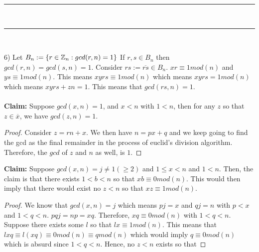 \documentclass[../Main.tex]{subfiles}
\begin{document}
\begin{center}    
    \rule[1ex]{.8\textwidth}{1pt}\\
    \rule[1.9ex]{.7\textwidth}{.6pt}\\[-6pt]
    
\end{center}
6) Let $B_n:=\{r \in \mathbb Z_n: gcd(r,n)=1\}$
If $r, s \in B_n$ then $gcd(r,n)=gcd(s,n)=1$. Consider $rs:= \overline{rs} \in B_n$. $xr \equiv 1 mod(n)$ and $ys \equiv 1 mod(n)$. This means $xy rs \equiv 1 mod(n)$ which means $xy rs=1 mod(n)$ which means $xy rs +zn=1$. This means that $gcd(rs,n)=1$.
\\\\ \textbf{Claim:} Suppose $gcd(x,n)=1$, and $x< n$ with $1<n$, then for any $z$ so that $z \in \overline{x}$, we have $gcd(z,n)=1$. 
\\ \begin{proof}
Consider $z=rn+x$. We then have $n=px+q$ and we keep going to find the gcd as the final remainder in the process of euclid's division algorithm. Therefore, the $gcd$ of $z$ and $n$ as well, is $1$. 
\end{proof}
\textbf{Claim:} Suppose $gcd(x,n)=j \neq 1(\geq 2)$ and $1 \leq x <n$ and $1<n$. Then, the claim is that there exists $1<b<n$ so that $xb\equiv 0 mod(n)$. This would then imply that there would exist no $z<n$ so that $xz\equiv 1mod(n)$.
\\ \begin{proof}
We know that $gcd(x,n)=j$ which means $pj=x$ and $qj=n$ with $p<x$ and $1<q<n$. $pqj=np=xq$. Therefore, $xq\equiv 0 mod(n)$ with $1<q<n$. Suppose there exists some $l$ so that $lx\equiv 1 mod(n)$. This means that $lxq\equiv l(xq) \equiv 0 mod(n) \equiv q mod(n)$ which would imply $q\equiv 0 mod(n)$ which is absurd since $1<q<n$. Hence, no $z<n$ exists so that  
\end{proof}  
\end{document}
